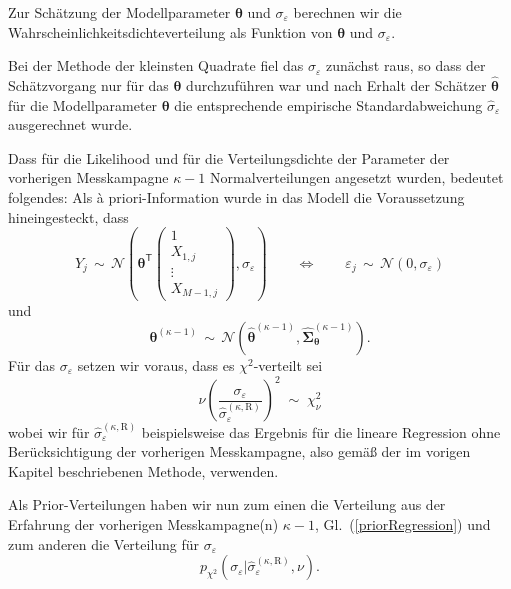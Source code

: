 Zur Schätzung der Modellparameter $\boldsymbol{\theta}$ und $\sigma_{\varepsilon}$
berechnen wir die Wahrscheinlichkeitsdichteverteilung als Funktion von
$\boldsymbol{\theta}$ und $\sigma_{\varepsilon}$.

Bei der Methode der kleinsten Quadrate fiel das $\sigma_{\varepsilon}$ zunächst raus,
so dass der Schätzvorgang nur für das $\boldsymbol{\theta}$ durchzuführen war und nach
Erhalt der Schätzer $\boldsymbol{\hat \theta}$ für die Modellparameter
$\boldsymbol{\theta}$ die entsprechende empirische Standardabweichung
$\hat \sigma_{\varepsilon}$ ausgerechnet wurde.

Dass für die Likelihood und für die Verteilungsdichte der Parameter der
vorherigen Messkampagne $\kappa-1$ Normalverteilungen angesetzt wurden, bedeutet folgendes:
Als {\`a} priori-Information wurde in das Modell die Voraussetzung hineingesteckt, dass
\begin{equation}
Y_j \, \sim \, \mathcal{N}(\boldsymbol{\theta}^\mathsf{T} \left(
\begin{array}{c} 1\\ X_{1,j}\\ \vdots \\ X_{M-1,j}\end{array}\right), \sigma_{\varepsilon})
\qquad \Leftrightarrow \qquad
\varepsilon_j \, \sim \, \mathcal{N}(0, \sigma_{\varepsilon})
\end{equation}
und
\begin{equation}
\boldsymbol{\theta}^{(\kappa-1)} \, \sim \,
\mathcal{N}(\boldsymbol{\hat \theta}^{(\kappa-1)},
\boldsymbol{\hat \Sigma}_{\boldsymbol{\theta}}^{(\kappa-1)}) .
\end{equation}
Für das $\sigma_{\varepsilon}$ setzen wir voraus, dass es $\chi^2$-verteilt sei
\begin{equation}
\nu \left(\frac{\sigma_{\varepsilon}}{\hat \sigma_{\varepsilon}^{(\kappa,\mathrm{R})}}\right)^2
\; \sim \; \chi^2_{\nu}
\end{equation}
wobei wir für $\hat \sigma_{\varepsilon}^{(\kappa,\mathrm{R})}$ beispielsweise das Ergebnis
für die lineare Regression ohne Berücksichtigung der vorherigen Messkampagne, also gemäß
der im vorigen Kapitel beschriebenen Methode, verwenden.

Als Prior-Verteilungen haben wir nun zum einen die Verteilung aus der
Erfahrung der vorherigen Messkampagne(n) $\kappa-1$, Gl.~(\ref{priorRegression})
und zum anderen die Verteilung für $\sigma_{\varepsilon}$
\begin{equation}
p_{\chi^2} (\sigma_{\varepsilon} | \hat \sigma_{\varepsilon}^{(\kappa,\mathrm{R})}, \nu) .
\label{priorSigmaEpsi}
\end{equation}

